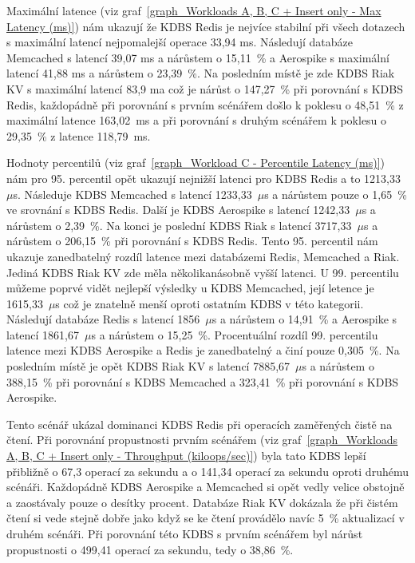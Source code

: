 \documentclass[czech,master,dept460,male,csharp,cpdeclaration]{diploma}
\begin{document}
	Maximální latence (viz graf~\ref{graph_Workloads A, B, C + Insert only - Max Latency (ms)}) nám ukazují že KDBS Redis je nejvíce stabilní při všech dotazech s maximální latencí nejpomalejší operace 33,94 ms. Následují databáze Memcached s latencí 39,07 ms a nárůstem o 15,11~\% a Aerospike s maximální latencí 41,88 ms a nárůstem o 23,39~\%. Na posledním místě je zde KDBS Riak KV s maximální latencí 83,9 ma což je nárůst o 147,27~\% při porovnání s KDBS Redis, každopádně při porovnání s prvním scénářem došlo k poklesu o 48,51~\% z maximální latence 163,02~ms a při porovnání s druhým scénářem k poklesu o 29,35~\% z latence 118,79~ms.
	
	Hodnoty percentilů (viz graf~\ref{graph_Workload C - Percentile Latency (ms)}) nám pro 95. percentil opět ukazují nejnižší latenci pro KDBS Redis a to 1213,33~$\mu$s. Následuje KDBS Memcached s latencí 1233,33~$\mu$s a nárůstem pouze o 1,65~\% ve srovnání s KDBS Redis. Další je KDBS Aerospike s latencí 1242,33~$\mu$s a nárůstem o 2,39~\%. Na konci je poslední KDBS Riak s latencí 3717,33~$\mu$s a nárůstem o 206,15~\% při porovnání s KDBS Redis. Tento 95. percentil nám ukazuje zanedbatelný rozdíl latence mezi databázemi Redis, Memcached a Riak. Jediná KDBS Riak KV zde měla několikanásobně vyšší latenci. U 99. percentilu můžeme poprvé vidět nejlepší výsledky u KDBS Memcached, její letence je 1615,33~$\mu$s což je znatelně menší oproti ostatním KDBS v této kategorii. Následují databáze Redis s latencí 1856~$\mu$s a nárůstem o 14,91~\% a Aerospike s latencí 1861,67~$\mu$s a nárůstem o 15,25~\%. Procentuální rozdíl 99. percentilu latence mezi KDBS Aerospike a Redis je zanedbatelný a činí pouze 0,305~\%. Na posledním místě je opět KDBS Riak KV s latencí 7885,67~$\mu$s a nárůstem o 388,15~\% při porovnání s KDBS Memcached a 323,41~\% při porovnání s KDBS Aerospike.
	
	Tento scénář ukázal dominanci KDBS Redis při operacích zaměřených čistě na čtení. Při porovnání propustnosti prvním scénářem (viz graf~\ref{graph_Workloads A, B, C + Insert only - Throughput (kiloops/sec)}) byla tato KDBS lepší přibližně o 67,3 operací za sekundu a o 141,34 operací za sekundu oproti druhému scénáři. Každopádně KDBS Aerospike a Memcached si opět vedly velice obstojně a zaostávaly pouze o desítky procent. Databáze Riak KV dokázala že při čistém čtení si vede stejně dobře jako když se ke čtení provádělo navíc 5~\% aktualizací v druhém scénáři. Při porovnání této KDBS s prvním scénářem byl nárůst propustnosti o 499,41 operací za sekundu, tedy o 38,86~\%.
	
\end{document}
